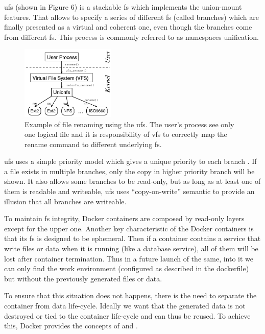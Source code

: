 \ac{ufs} (shown in Figure 6) is a stackable \ac{fs} which implements the union-mount features. That allows
to specify a series of different \ac{fs} (called branches) which are finally presented as a virtual
and coherent one, even though the branches come from different \ac{fs}. This process is commonly
referred to as namespaces unification.

\begin{figure}
	\centering{}
	\includegraphics[width=0.4\textwidth]{chapters/background/images/unionfs.png}
	\caption[Docker \ac{ufs} overview]{Example of file renaming using the \acf{ufs}. The user's process
		see only one logical file and it is responsibility of \acf{vfs} to correctly map the rename command
		to different underlying \acf{fs}.}
	\label{img:background-docker-architecture-unionfs}
\end{figure}

\ac{ufs} uses a simple priority model which gives a unique priority to each branch . If a file exists
in multiple branches, only the copy in higher priority branch will be shown. It also allows some branches
to be read-only, but as long as at least one of them is readable and writeable, \ac{ufs} uses ``copy-on-write''
semantic to provide an illusion that all branches are writeable.

To maintain \ac{fs} integrity, Docker containers are composed by read-only layers except for the 
upper one. Another key characteristic of the Docker containers is that its \ac{fs} is designed to
be ephemeral. Then if a container contains a service that write files or data when it is running 
(like a database service), all of them will be lost after container termination. Thus in a future
launch of the same, into it we can only find the work environment (configured as described in 
the dockerfile) but without the previously generated files or data.

To ensure that this situation does not happens, there is the need to separate the container from
data life-cycle. Ideally we want that the generated data is not destroyed or tied to the container
life-cycle and can thus be reused. To achieve this, Docker provides the concepts of 
and .


